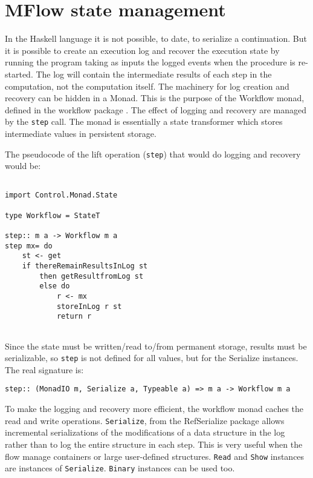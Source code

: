 \documentclass{tmr}
\begin{document}
 
\section{ MFlow state management} 
 
In the Haskell language it is not possible, to date, to serialize a continuation. But it is possible to create an execution log and recover the execution state by running the program taking as inputs the logged events when the procedure is re-started. The log will contain the intermediate results of each step in the computation, not the computation itself. The machinery for log creation and recovery can be hidden in a Monad. This is the purpose of the Workflow monad, defined in the workflow package \cite{auth:workflow}. The effect of logging and recovery are managed by the {\tt step} call. The monad is essentially a state transformer which stores intermediate values in persistent storage. 
 
The pseudocode of the lift operation ({\tt step}) that would do 
logging and recovery would be: 
 
{\tt 
 
\begin{verbatim} 
 
import Control.Monad.State 
 
type Workflow = StateT 
 
step:: m a -> Workflow m a 
step mx= do 
    st <- get 
    if thereRemainResultsInLog st 
        then getResultfromLog st 
        else do 
            r <- mx 
            storeInLog r st 
            return r 
 
\end{verbatim} 
 
} 
 
Since the  state must be written/read to/from permanent storage, results must be serializable, so {\tt step} is not defined for all values, but for the Serialize instances. The real signature is: 
 
{\tt 
 
\begin{verbatim} 
step:: (MonadIO m, Serialize a, Typeable a) => m a -> Workflow m a 
\end{verbatim} 
 
} 
 
 
To make the logging and recovery more efficient, the workflow monad caches the read and write operations.  {\tt Serialize}, from the RefSerialize \cite{auth:refserialize} package allows incremental serializations of the modifications of a data structure in the log rather than to log the entire structure in each step. This is very useful when the flow manage containers or large user-defined structures. {\tt Read} and {\tt Show} instances are instances of {\tt Serialize}. {\tt Binary} instances can be used too. 
 
\end{document}
